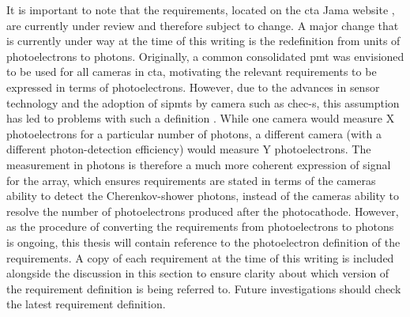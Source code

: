 It is important to note that the requirements, located on the \gls{cta} Jama website \cite{cta-jama}, are currently under review and therefore subject to change. A major change that is currently under way at the time of this writing is the redefinition from units of photoelectrons to photons. Originally, a common consolidated \gls{pmt} was envisioned to be used for all cameras in \gls{cta}, motivating the relevant requirements to be expressed in terms of photoelectrons. However, due to the advances in sensor technology and the adoption of \glspl{sipmt} by camera such as \gls{chec-s}, this assumption has led to problems with such a definition \cite{petophotons}. While one camera would measure X photoelectrons for a particular number of photons, a different camera (with a different photon-detection efficiency) would measure Y photoelectrons. The measurement in photons is therefore a much more coherent expression of signal for the array, which ensures requirements are stated in terms of the cameras ability to detect the Cherenkov-shower photons, instead of the cameras ability to resolve the number of photoelectrons produced after the photocathode. However, as the procedure of converting the requirements from photoelectrons to photons is ongoing, this thesis will contain reference to the photoelectron definition of the requirements. A copy of each requirement at the time of this writing is included alongside the discussion in this section to ensure clarity about which version of the requirement definition is being referred to. Future investigations should check the latest requirement definition. \vfill

